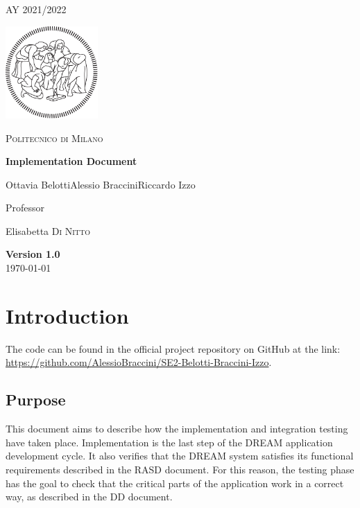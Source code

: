 \documentclass[table, 12pt]{article}
\begin{document}
\begin{titlepage}
    \centering
    {\scshape\large AY 2021/2022 \par}
    \vfill
    \includegraphics[width=100pt]{assets/logo-polimi-new.pdf}\par\vspace{1cm}
    {\scshape\LARGE Politecnico di Milano \par}
    \vspace{1.5cm}
    {\huge\bfseries Implementation Document \par}
    \vspace{2cm}
    {\Large {Ottavia Belotti\quad Alessio Braccini\quad Riccardo Izzo}\par}
    \vfill
    {\large Professor\par
        Elisabetta \textsc{Di Nitto}}
    \vfill
    {\large \textbf{Version 1.0}\\ \today \par}
\end{titlepage}


\thispagestyle{plain}
\mbox{}
\newpage
{}
\tableofcontents
\newpage
{}

\section{Introduction}
The code can be found in the official project repository on GitHub at the link: \url{https://github.com/AlessioBraccini/SE2-Belotti-Braccini-Izzo}.
\subsection{Purpose}

This document aims to describe how the implementation and integration testing have taken place.
Implementation is the last step of the DREAM application development cycle.
It also verifies that the DREAM system satisfies its functional requirements described in the RASD document.
For this reason, the testing phase has the goal to check that the critical parts of the application work in a correct way, as described in the DD document.
\end{document}
